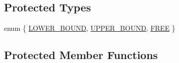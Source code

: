 \subsection*{Protected Types}
\begin{DoxyCompactItemize}
\item 
enum \{ \hyperlink{class_s_v_m289___b_f_s_1_1_solver_a39d4f0956eb61dda8e376183980c0796a7092a32661d9a2f7903ffd7a99abc332}{L\+O\+W\+E\+R\+\_\+\+B\+O\+U\+ND}, 
\hyperlink{class_s_v_m289___b_f_s_1_1_solver_a39d4f0956eb61dda8e376183980c0796a7ef8cfc0b3f0c0a3b0deedd35c546da0}{U\+P\+P\+E\+R\+\_\+\+B\+O\+U\+ND}, 
\hyperlink{class_s_v_m289___b_f_s_1_1_solver_a39d4f0956eb61dda8e376183980c0796a7dc5d6ae88ca8b989141a023d64cfe0b}{F\+R\+EE}
 \}
\end{DoxyCompactItemize}
\subsection*{Protected Member Functions}
